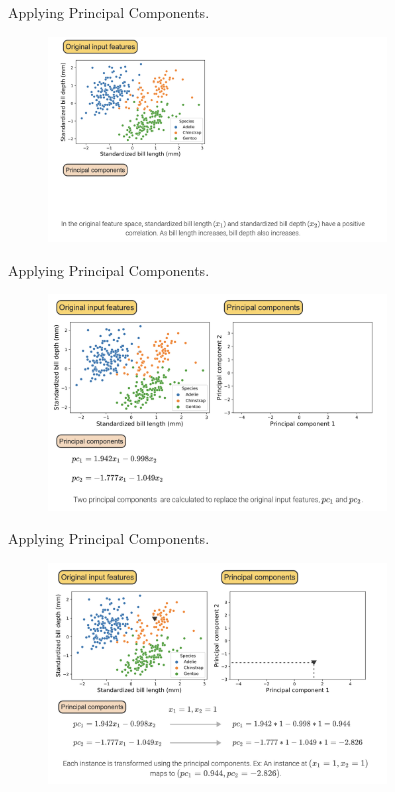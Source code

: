 \documentclass[10pt,dvipsnames]{beamer}
\begin{document}
\begin{frame}{Applying Principal Components.}
	\begin{figure}[ht]
		\centering
		\includegraphics[width=0.8\textwidth]{imgs/df_13.png}
	\end{figure}
\end{frame}

\begin{frame}{Applying Principal Components.}
	\begin{figure}[ht]
		\centering
		\includegraphics[width=0.8\textwidth]{imgs/df_14.png}
	\end{figure}
\end{frame}

\begin{frame}{Applying Principal Components.}
	\begin{figure}[ht]
		\centering
		\includegraphics[width=0.8\textwidth]{imgs/df_15.png}
	\end{figure}
\end{frame}
\end{document}
